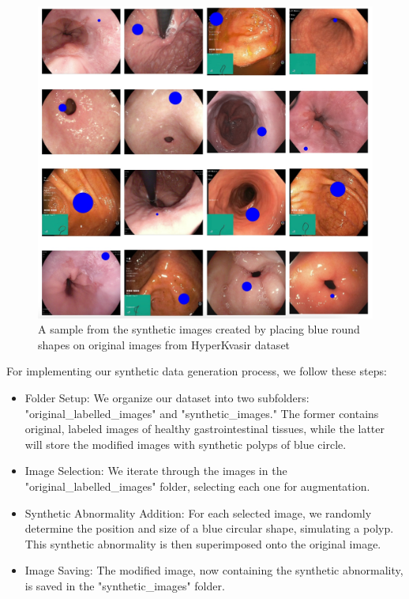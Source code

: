 \documentclass[UKenglish,12pt]{master-style}
\begin{document}
\begin{figure}[ht]
    \centering
    \includegraphics[width=1\textwidth]{Images/Synthetic_images.jpeg}
    \caption{A sample from the synthetic images created by placing blue round shapes on original images from HyperKvasir dataset}
    \label{fig:Synthetic_image}
\end{figure}

For implementing our synthetic data generation process, we follow these steps:
\begin{itemize}
\item Folder Setup: We organize our dataset into two subfolders: "original\_labelled\_images" and "synthetic\_images." The former contains original, labeled images of healthy gastrointestinal tissues, while the latter will store the modified images with synthetic polyps of blue circle.

\item Image Selection: We iterate through the images in the "original\_labelled\_images" folder, selecting each one for augmentation.

\item Synthetic Abnormality Addition: For each selected image, we randomly determine the position and size of a blue circular shape, simulating a polyp. This synthetic abnormality is then superimposed onto the original image.

\item Image Saving: The modified image, now containing the synthetic abnormality, is saved in the "synthetic\_images" folder.
\end{itemize}
\end{document}
